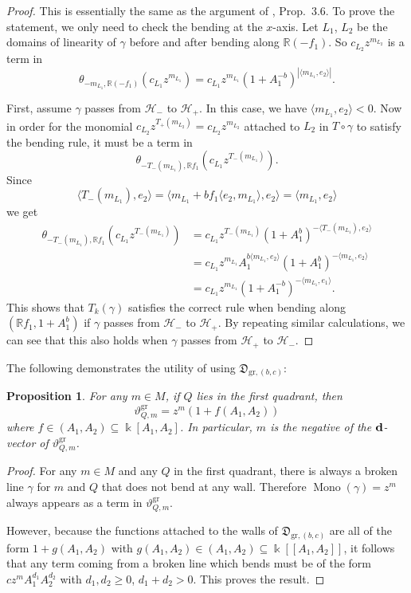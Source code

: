 \documentclass[11pt]{amsart}
\newtheorem{prop}[theorem]{Proposition}
\theoremstyle{remark}
\numberwithin{equation}{section}
\newcommand{\RR}{\mathbb{R}}
\newcommand{\DD}{\mathfrak{D}}
\newcommand{\gr}{\mathrm{gr}}
\newcommand{\Mono}{\operatorname{Mono}}
\begin{document}
\begin{proof}
  This is essentially the same as the argument of \cite{GHKK}, Prop.\ 3.6.  To
  prove the statement, we only need to check the bending at the $x$-axis. Let
  $L_1$, $L_2$ be the domains of linearity of $\gamma$ before and after bending
  along $\RR (-f_1)$. So $c_{L_2} z^{m_{L_2}}$ is a term in 
  \[
    \theta_{-m_{L_1},\RR(-f_1)} (c_{L_1} z^{m_{L_1}})
    = 
    c_{L_1} z^{m_{L_1}} (1+A_1^{-b}) ^{|\langle  m_{L_1}, e_2  \rangle|}.
  \]

  First, assume $\gamma$ passes from $\mathcal{H}_-$ to $\mathcal{H}_+$. In this
  case, we have $\langle m_{L_1}, e_2 \rangle < 0$. Now in order for the monomial
  $c_{L_2}z^{T_+(m_{L_2})} =c_{L_2}z^{m_{L_2}}$ attached to $L_2$ in
  $T\circ\gamma$ to satisfy the bending rule, it must be a term in
  \[
    \theta_{-T_-(m_{L_1}),\RR f_1} (c_{L_1} z^{T_-(m_{L_1})}). 
  \]
  Since 
  \[
    \langle T_-(m_{L_1}), e_2\rangle 
    =
    \langle m_{L_1}+bf_1\langle e_2, m_{L_1} \rangle, e_2\rangle
    =
    \langle m_{L_1}, e_2 \rangle
  \]
  we get
  \begin{align*} 
    \theta_{-T_-(m_{L_1}),\RR f_1} (c_{L_1} z^{T_-(m_{L_1})}) 
    & =
    c_{L_1} z^{T_-(m_{L_1})} (1+A_1^b) ^{-\langle T_-(m_{L_1}), e_2\rangle}
    \\
    & = 
    c_{L_1} z^{m_{L_1}} A_1^{b\langle m_{L_1}, e_2\rangle} 
    (1+A_1^b)^{- \langle m_{L_1}, e_2 \rangle} 
    \\
    & = 
    c_{L_1} z^{m_{L_1}} (1+A_1^{-b}) ^{-\langle  m_{L_1}, e_1  \rangle}.
  \end{align*}
  This shows that $T_k(\gamma)$ satisfies the correct rule when bending along
  $(\RR f_1, 1+A_1^b)$ if $\gamma$ passes from $\mathcal{H}_-$ to
  $\mathcal{H}_+$. By repeating similar calculations, we can see that this also
  holds when $\gamma$ passes from $\mathcal{H}_+$ to $\mathcal{H}_-$.
\end{proof}

The following demonstrates the utility of using $\DD_{\gr,(b,c)}$:

\begin{prop}
  For any  $m\in M$, if $Q$ lies in the first quadrant, then 
  \[
    \vartheta^{\gr}_{Q, m}=z^{m}(1+f(A_1,A_2))
  \]
  where $f\in (A_1,A_2)\subseteq \Bbbk[A_1,A_2]$.
  In particular, $m$ is the negative of the ${\bf d}$-vector of
  $\vartheta^{\gr}_{Q,m}$.
\end{prop}

\begin{proof}
  For any $m\in M$ and any $Q$ in the first quadrant, there is always a broken
  line $\gamma$ for $m$ and $Q$ that does not bend at any wall. Therefore $\Mono
  (\gamma) = z^{m}$ always appears as a term in $\vartheta^{\gr}_{Q,m}$.

  However, because the functions attached to the walls of
  $\DD_{\gr,(b,c)}$ are all of the form $1+g(A_1,A_2)$ with $g(A_1,A_2) \in
  (A_1,A_2) \subseteq \Bbbk[[A_1,A_2]]$, it follows that any term coming from a
  broken line which bends must be of the form $cz^{m}A_1^{d_1}A_2^{d_2}$ with
  $d_1,d_2\ge 0$, $d_1+d_2>0$. This proves the result.
\end{proof}
\end{document}
